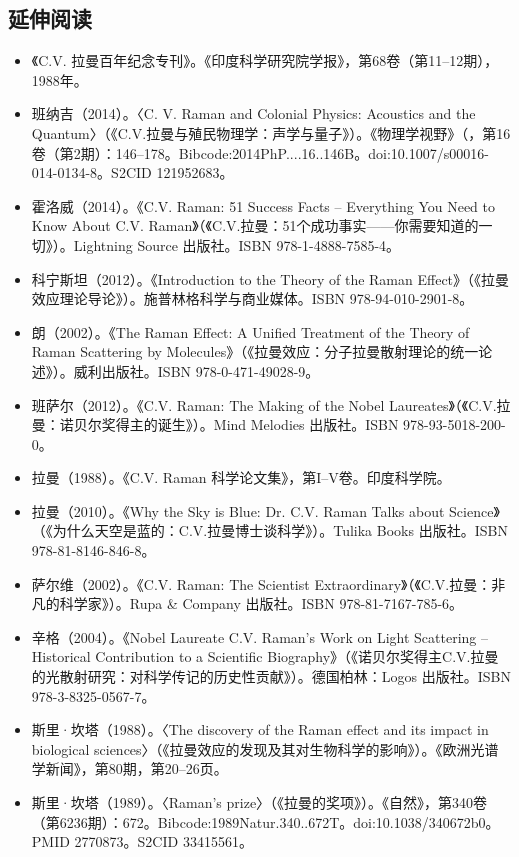 \subsection{延伸阅读}
\begin{itemize}
\item 《C.V. 拉曼百年纪念专刊》。《印度科学研究院学报》，第68卷（第11–12期），1988年。
\item 班纳吉（2014）。〈C. V. Raman and Colonial Physics: Acoustics and the Quantum〉（《C.V.拉曼与殖民物理学：声学与量子》）。《物理学视野》（，第16卷（第2期）：146–178。Bibcode:2014PhP....16..146B。doi:10.1007/s00016-014-0134-8。S2CID 121952683。
\item 霍洛威（2014）。《C.V. Raman: 51 Success Facts – Everything You Need to Know About C.V. Raman》（《C.V.拉曼：51个成功事实——你需要知道的一切》）。Lightning Source 出版社。ISBN 978-1-4888-7585-4。
\item 科宁斯坦（2012）。《Introduction to the Theory of the Raman Effect》（《拉曼效应理论导论》）。施普林格科学与商业媒体。ISBN 978-94-010-2901-8。
\item 朗（2002）。《The Raman Effect: A Unified Treatment of the Theory of Raman Scattering by Molecules》（《拉曼效应：分子拉曼散射理论的统一论述》）。威利出版社。ISBN 978-0-471-49028-9。
\item 班萨尔（2012）。《C.V. Raman: The Making of the Nobel Laureates》（《C.V.拉曼：诺贝尔奖得主的诞生》）。Mind Melodies 出版社。ISBN 978-93-5018-200-0。
\item 拉曼（1988）。《C.V. Raman 科学论文集》，第I–V卷。印度科学院。
\item 拉曼（2010）。《Why the Sky is Blue: Dr. C.V. Raman Talks about Science》（《为什么天空是蓝的：C.V.拉曼博士谈科学》）。Tulika Books 出版社。ISBN 978-81-8146-846-8。
\item 萨尔维（2002）。《C.V. Raman: The Scientist Extraordinary》（《C.V.拉曼：非凡的科学家》）。Rupa & Company 出版社。ISBN 978-81-7167-785-6。
\item 辛格（2004）。《Nobel Laureate C.V. Raman's Work on Light Scattering – Historical Contribution to a Scientific Biography》（《诺贝尔奖得主C.V.拉曼的光散射研究：对科学传记的历史性贡献》）。德国柏林：Logos 出版社。ISBN 978-3-8325-0567-7。
\item 斯里·坎塔（1988）。〈The discovery of the Raman effect and its impact in biological sciences〉（《拉曼效应的发现及其对生物科学的影响》）。《欧洲光谱学新闻》，第80期，第20–26页。
\item 斯里·坎塔（1989）。〈Raman's prize〉（《拉曼的奖项》）。《自然》，第340卷（第6236期）：672。Bibcode:1989Natur.340..672T。doi:10.1038/340672b0。PMID 2770873。S2CID 33415561。
\end{itemize}
